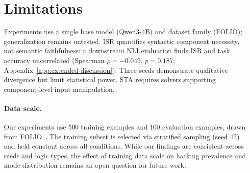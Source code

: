 \section{Limitations}
\label{sec:limitations}

Experiments use a single base model (Qwen3-4B) and dataset family (FOLIO); generalization remains untested.
ISR quantifies syntactic component necessity, not semantic faithfulness: a downstream NLI evaluation finds ISR and task accuracy uncorrelated (Spearman $\rho{=}{-}0.049$, $p{=}0.187$; Appendix~\ref{app:extended-discussion}).
Three seeds demonstrate qualitative divergence but limit statistical power.
STA requires solvers supporting component-level input manipulation.

\paragraph{Data scale.}
Our experiments use 500 training examples and 100 evaluation examples, drawn from FOLIO~\citep{folio}.
The training subset is selected via stratified sampling (seed 42) and held constant across all conditions.
While our findings are consistent across seeds and logic types, the effect of training data scale on hacking prevalence and mode distribution remains an open question for future work.
